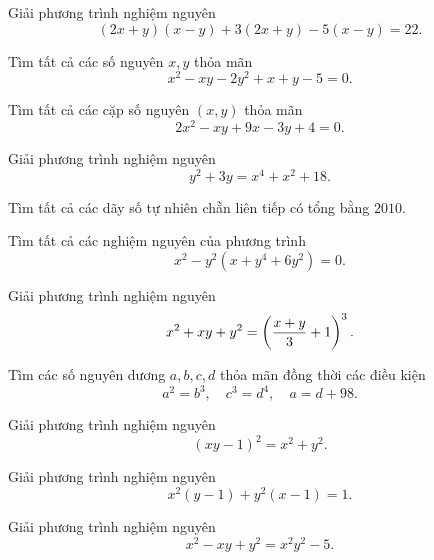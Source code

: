 \begin{btt}
Giải phương trình nghiệm nguyên $$(2x+y)(x-y)+3(2x+y)-5(x-y)=22.$$
\end{btt}

\begin{btt}
Tìm tất cả các số nguyên $x, y$ thỏa mãn $$x^2-xy-2y^2+x+y-5=0.$$
\end{btt}

\begin{btt}
Tìm tất cả các cặp số nguyên $(x,y)$ thỏa mãn
$$2 x^{2}-x y+9 x-3 y+4=0.$$
\end{btt}

\begin{btt}
Giải phương trình nghiệm nguyên $$y^2+3y=x^4+x^2+18.$$
\end{btt}

\begin{btt}
Tìm tất cả các dãy số tự nhiên chẵn liên tiếp có tổng bằng $2010.$
\end{btt}

\begin{btt}
Tìm tất cả các nghiệm nguyên của phương trình $$x^{2}-y^{2}\left(x+y^{4}+6 y^{2}\right)=0.$$
\end{btt}

\begin{btt}
Giải phương trình nghiệm nguyên \[x^2+xy+y^2=\left(\displaystyle \dfrac{x+y}{3}+1 \right)^3.\]
\end{btt}

\begin{btt}
Tìm các số nguyên dương $a, b, c, d$  thỏa mãn đồng thời các điều kiện
\[{a^2} = {b^3},\quad {c^3} = {d^4},\quad a = d + 98.\]
\end{btt}

\begin{btt}
Giải phương trình nghiệm nguyên $$(xy-1)^2=x^2+y^2.$$
\end{btt}

\begin{btt}
Giải phương trình nghiệm nguyên
$$x^{2}(y - 1) + y^{2}(x-1) = 1.$$
\end{btt}

\begin{btt}
Giải phương trình nghiệm nguyên $$x^2-xy+y^2=x^2y^2-5.$$
\end{btt}

